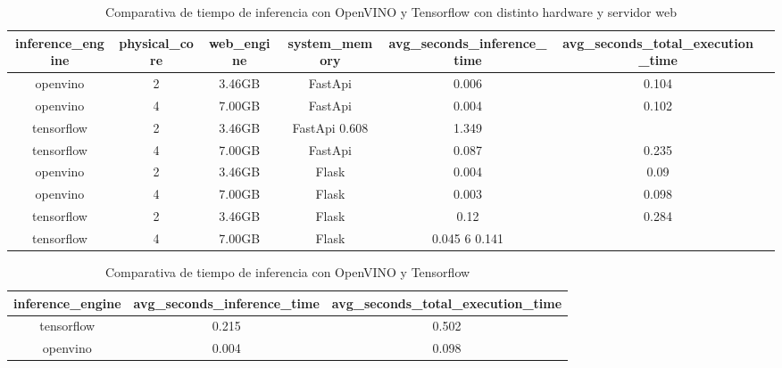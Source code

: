 \begin{table}[t]
    \begin{center}
        \begin{tabular}{| c | c | c | c | c | c | c |}
            \hline
            inference\_engine & physical\_core & web\_engine & system\_memory & avg\_seconds\_inference\_time & avg\_seconds\_total\_execution\_time \\ \hline
            openvino & 2 & 3.46GB & FastApi & 0.006 & 0.104 \\
            openvino & 4 & 7.00GB & FastApi & 0.004 & 0.102 \\
            tensorflow & 2 & 3.46GB & FastApi 0.608 & 1.349 \\
            tensorflow & 4 & 7.00GB & FastApi & 0.087 & 0.235 \\
            openvino & 2 & 3.46GB & Flask & 0.004 & 0.09 \\
            openvino & 4 & 7.00GB & Flask &0.003 & 0.098 \\
            tensorflow & 2 & 3.46GB & Flask & 0.12 & 0.284 \\
            tensorflow & 4 & 7.00GB & Flask & 0.045 6 0.141 \\ \hline
        \end{tabular}
        \caption{Comparativa de tiempo de inferencia con OpenVINO y Tensorflow con distinto hardware y servidor web}
        \label{tab:Comparativa de tiempo de inferencia con OpenVINO y Tensorflow con distinto hardware y servidor web}
    \end{center}
\end{table}

\begin{table}[t]
    \begin{center}
        \begin{tabular}{| c | c | c |}
            \hline
            inference\_engine & avg\_seconds\_inference\_time & avg\_seconds\_total\_execution\_time \\ \hline
            tensorflow & 0.215 & 0.502 \\
            openvino & 0.004 & 0.098 \\ \hline
        \end{tabular}
        \caption{Comparativa de tiempo de inferencia con OpenVINO y Tensorflow}
        \label{tab:Comparativa de tiempo de inferencia con OpenVINO y Tensorflow}
    \end{center}
\end{table}

